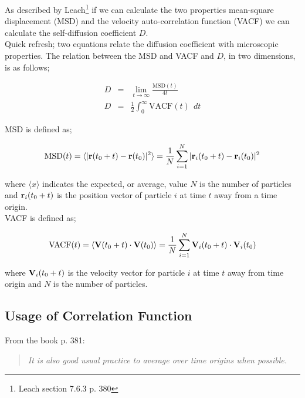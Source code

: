 \documentclass{article}
\newcommand{\expval}[1]{\langle #1 \rangle} %
\renewcommand{\vec}[1]{{\bf #1}} %
\begin{document}
As described by Leach\footnote{Leach section 7.6.3 p. 380}
if we can calculate the two properties
mean-square displacement (MSD)
and the velocity auto-correlation function (VACF)
we can calculate the self-diffusion coefficient $D$.\\

Quick refresh;
two equations relate the diffusion coefficient with microscopic properties.
The relation between the MSD and VACF and $D$, in two dimensions, is as follows;

\begin{eqnarray}
    D &=& \lim_{t\rightarrow \infty} \frac{\mathrm{MSD}(t)}{4t}\\
    D &=& \frac{1}{2} \int_0^\infty \mathrm{VACF}(t) \ \ dt
\end{eqnarray}

MSD is defined as;

\begin{eqnarray}
    \mathrm{MSD}(t) = \expval{|\vec{r}(t_0 + t) - \vec{r}(t_0)|^2}
    = \frac{1}{N} \sum_{i=1}^N | \vec{r}_i(t_0 + t) - \vec{r}_i(t_0)  |^2
\end{eqnarray}

where $\expval{x}$ indicates the expected, or average, value
$N$ is the number of particles and
$\vec{r}_i(t_0 + t)$ is the position vector of particle $i$ at time $t$ away from a time origin.\\

VACF is defined as;

\begin{eqnarray}
    \mathrm{VACF}(t) = \expval{\vec{V}(t_0 + t)\cdot\vec{V}(t_0)}
    = \frac{1}{N} \sum_{i=1}^N \vec{V}_i(t_0 + t) \cdot \vec{V}_i(t_0)
\end{eqnarray}

where
$\vec{V}_i(t_0 + t)$ is the velocity vector for particle $i$ at time $t$
away from time origin
and $N$ is the number of particles.

\newpage

\subsection{Usage of Correlation Function}

From the book p. 381:

\begin{quotation}
    \em
    It is also good usual practice to average over time origins when
    possible.
\end{quotation}
\end{document}
